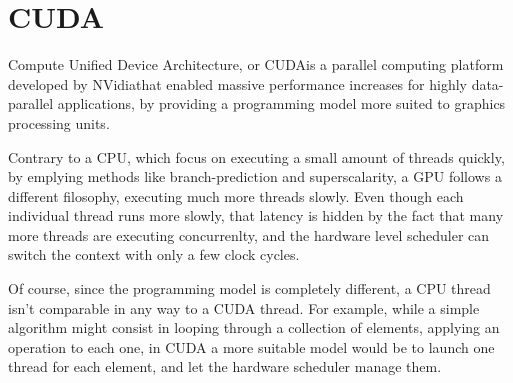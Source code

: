 \section{CUDA}
\label{sec:cuda}


Compute Unified Device Architecture, or CUDA\tm is a parallel computing platform developed by NVidia\tr that enabled massive performance increases for highly data-parallel applications, by providing a programming model more suited to graphics processing units.

Contrary to a CPU, which focus on executing a small amount of threads quickly, by emplying methods like branch-prediction and superscalarity, a GPU follows a different filosophy, executing much more threads slowly. Even though each individual thread runs more slowly, that latency is hidden by the fact that many more threads are executing concurrenlty, and the hardware level scheduler can switch the context with only a few clock cycles.

Of course, since the programming model is completely different, a CPU thread isn't comparable in any way to a CUDA thread. For example, while a simple algorithm might consist in looping through a collection of elements, applying an operation to each one, in CUDA a more suitable model would be to launch one thread for each element, and let the hardware scheduler manage them.




